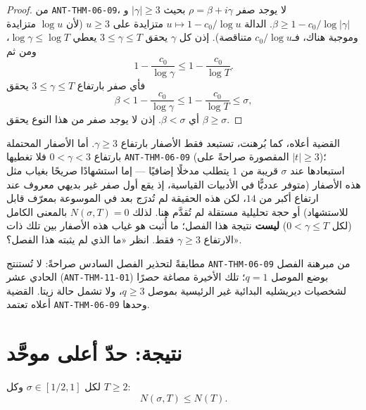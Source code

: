 \begin{proof}
من \textenglish{\texttt{ANT-THM-06-09}}، لا يوجد صفر \(\rho=\beta+i\gamma\)
بحيث \(|\gamma|\ge3\) و\(\beta\ge1-c_0/\log|\gamma|\). الدالة
\(u\mapsto1-c_0/\log u\) متزايدة على \(u\ge3\) (لأن \(\log u\) متزايدة
وموجبة هناك، فـ\(c_0/\log u\) متناقصة). إذن كل \(\gamma\) يحقق
\(3\le\gamma\le T\) يعطي \(\log\gamma\le\log T\)، ومن ثم
\[
1-\frac{c_0}{\log\gamma}\le1-\frac{c_0}{\log T}.
\]
فأي صفر بارتفاع \(3\le\gamma\le T\) يحقق
\[
\beta<1-\frac{c_0}{\log\gamma}\le1-\frac{c_0}{\log T}\le\sigma,
\]
أي \(\beta<\sigma\). إذن لا يوجد صفر من هذا النوع يحقق \(\beta\ge\sigma\).
\end{proof}

\begin{remark}
\label{rem:density-small-height-gap}
القضية أعلاه، كما بُرهنت، تستبعد فقط الأصفار بارتفاع \(\gamma\ge3\).
أما الأصفار المحتملة بارتفاع \(0<\gamma<3\) فلا تغطيها
\textenglish{\texttt{ANT-THM-06-09}} (المقصورة صراحةً على \(|t|\ge3\))؛
استبعادها عند \(\sigma\) قريبة من \(1\) يتطلب مدخلًا إضافيًا — إما
استشهادًا صريحًا بغياب مثل هذه الأصفار (متوفر عدديًّا في الأدبيات
القياسية، إذ يقع أول صفر غير بديهي معروف عند ارتفاع أكبر من \(14\)،
لكن هذه الحقيقة لم تُدرَج بعد في الموسوعة بمعرّف قابل للاستشهاد) أو
حجة تحليلية مستقلة لم تُقدَّم هنا. لذلك \(N(\sigma,T)=0\) بالمعنى الكامل
(لكل \(0<\gamma\le T\)) \textbf{ليست} نتيجة هذا الفصل؛ ما أُثبت هو غياب هذه
الأصفار بين تلك ذات الارتفاع \(\gamma\ge3\) فقط. انظر «ما الذي لم يثبته
هذا الفصل؟».
\end{remark}

\begin{remark}
مطابقةً لتحذير الفصل السادس صراحةً: لا تُستنتج
\textenglish{\texttt{ANT-THM-06-09}} من مبرهنة الفصل الحادي عشر
(\textenglish{\texttt{ANT-THM-11-01}}) بوضع الموصل \(q=1\)؛ تلك الأخيرة
مصاغة حصرًا لشخصيات ديريشليه البدائية غير الرئيسية بموصل \(q\ge3\)، ولا
تشمل حالة زيتا. القضية أعلاه تعتمد \textenglish{\texttt{ANT-THM-06-09}}
وحدها.
\end{remark}

\section{نتيجة: حدّ أعلى موحَّد}

\begin{corollary}
\label{cor:density-upper-bound-uniform}
\provedhere
لكل \(\sigma\in[1/2,1]\) وكل \(T\ge2\):
\[
N(\sigma,T)\le N(T).
\]
\end{corollary}

